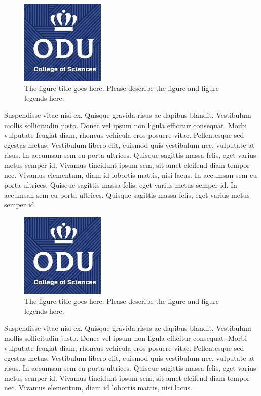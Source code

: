 \begin{figure}[tbh]
  \centering
  \includegraphics[height=4cm]{Figures/cos1.jpeg}
  \caption[The figure title goes here.]{The figure title goes here. Please describe the figure and figure legends here.}
  \label{fig:cos1_14}
\end{figure}

Suspendisse vitae nisi ex. Quisque gravida risus ac dapibus blandit. Vestibulum mollis sollicitudin justo. Donec vel ipsum non ligula efficitur consequat. Morbi vulputate feugiat diam, rhoncus vehicula eros posuere vitae. Pellentesque sed egestas metus. Vestibulum libero elit, euismod quis vestibulum nec, vulputate at risus. In accumsan sem eu porta ultrices. Quisque sagittis massa felis, eget varius metus semper id. Vivamus tincidunt ipsum sem, sit amet eleifend diam tempor nec. Vivamus elementum, diam id lobortis mattis, nisi lacus. In accumsan sem eu porta ultrices. Quisque sagittis massa felis, eget varius metus semper id. In accumsan sem eu porta ultrices. Quisque sagittis massa felis, eget varius metus semper id. 

\begin{figure}[tbh]
  \centering
  \includegraphics[height=4cm]{Figures/cos1.jpeg}
  \caption[The figure title goes here.]{The figure title goes here. Please describe the figure and figure legends here.}
  \label{fig:cos1_15}
\end{figure}

Suspendisse vitae nisi ex. Quisque gravida risus ac dapibus blandit. Vestibulum mollis sollicitudin justo. Donec vel ipsum non ligula efficitur consequat. Morbi vulputate feugiat diam, rhoncus vehicula eros posuere vitae. Pellentesque sed egestas metus. Vestibulum libero elit, euismod quis vestibulum nec, vulputate at risus. In accumsan sem eu porta ultrices. Quisque sagittis massa felis, eget varius metus semper id. Vivamus tincidunt ipsum sem, sit amet eleifend diam tempor nec. Vivamus elementum, diam id lobortis mattis, nisi lacus. 


